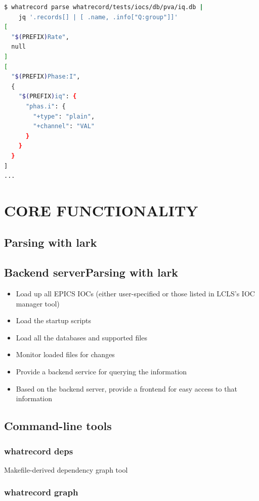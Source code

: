 \documentclass[letter,
               keeplastbox,   %
               ]{jacow}
\begin{document}
\begin{lstlisting}[language=bash]
$ whatrecord parse whatrecord/tests/iocs/db/pva/iq.db | 
    jq '.records[] | [ .name, .info["Q:group"]]'
[
  "$(PREFIX)Rate",
  null
]
[
  "$(PREFIX)Phase:I",
  {
    "$(PREFIX)iq": {
      "phas.i": {
        "+type": "plain",
        "+channel": "VAL"
      }
    }
  }
]
...

\end{lstlisting}

\section{CORE FUNCTIONALITY}

\subsection{Parsing with lark}

\subsection{Backend serverParsing with lark}

\begin{itemize}
  \item Load up all EPICS IOCs (either user-specified or those listed in LCLS’s IOC manager tool)
  \item Load the startup scripts
  \item Load all the databases and supported files
  \item Monitor loaded files for changes
  \item Provide a backend service for querying the information
  \item Based on the backend server, provide a frontend for easy access to that information
\end{itemize}

\subsection{Command-line tools}
\subsubsection{whatrecord deps}

Makefile-derived dependency graph tool

\subsubsection{whatrecord graph}
\end{document}

